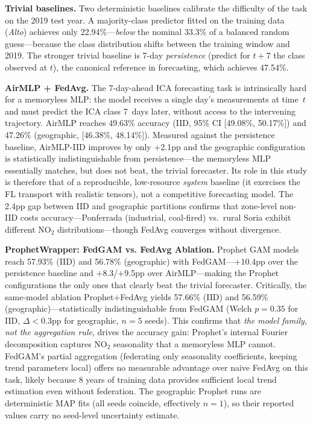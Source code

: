 ﻿\documentclass[journal]{IEEEtran}
\begin{document}
\textbf{Trivial baselines.} Two deterministic baselines calibrate the difficulty of the task on the 2019 test year. A majority-class predictor fitted on the training data (\textit{Alto}) achieves only 22.94\%---\emph{below} the nominal 33.3\% of a balanced random guess---because the class distribution shifts between the training window and 2019. The stronger trivial baseline is 7-day \emph{persistence} (predict for $t{+}7$ the class observed at $t$), the canonical reference in forecasting, which achieves 47.54\%.

\textbf{AirMLP + FedAvg.} The 7-day-ahead ICA forecasting task is intrinsically hard for a memoryless MLP: the model receives a single day's measurements at time~$t$ and must predict the ICA class 7~days later, without access to the intervening trajectory. AirMLP reaches 49.63\% accuracy (IID, 95\% CI [49.08\%, 50.17\%]) and 47.26\% (geographic, [46.38\%, 48.14\%]). Measured against the persistence baseline, AirMLP-IID improves by only $+$2.1pp and the geographic configuration is statistically indistinguishable from persistence---the memoryless MLP essentially matches, but does not beat, the trivial forecaster. Its role in this study is therefore that of a reproducible, low-resource \emph{system} baseline (it exercises the FL transport with realistic tensors), not a competitive forecasting model. The 2.4pp gap between IID and geographic partitions confirms that zone-level non-IID costs accuracy---Ponferrada (industrial, coal-fired) vs.~rural Soria exhibit different NO$_2$ distributions---though FedAvg converges without divergence.

\textbf{ProphetWrapper: FedGAM vs. FedAvg Ablation.} Prophet GAM models reach 57.93\% (IID) and 56.78\% (geographic) with FedGAM---$+$10.4pp over the persistence baseline and $+$8.3/$+$9.5pp over AirMLP---making the Prophet configurations the only ones that clearly beat the trivial forecaster. Critically, the same-model ablation Prophet+FedAvg yields 57.66\% (IID) and 56.59\% (geographic)---statistically indistinguishable from FedGAM (Welch $p{=}0.35$ for IID, $\Delta{<}0.3$pp for geographic, $n{=}5$ seeds). This confirms that \emph{the model family, not the aggregation rule}, drives the accuracy gain: Prophet's internal Fourier decomposition captures NO$_2$ seasonality that a memoryless MLP cannot. FedGAM's partial aggregation (federating only seasonality coefficients, keeping trend parameters local) offers no measurable advantage over naive FedAvg on this task, likely because 8 years of training data provides sufficient local trend estimation even without federation. The geographic Prophet runs are deterministic MAP fits (all seeds coincide, effectively $n{=}1$), so their reported values carry no seed-level uncertainty estimate.
\end{document}
